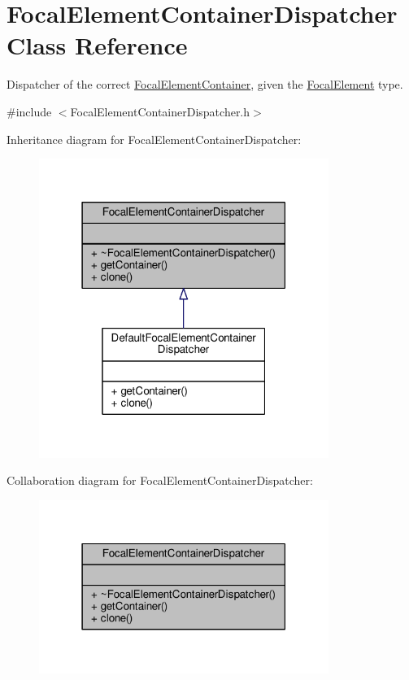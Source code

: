 \hypertarget{classFocalElementContainerDispatcher}{}\section{Focal\+Element\+Container\+Dispatcher Class Reference}
\label{classFocalElementContainerDispatcher}


Dispatcher of the correct \hyperlink{classFocalElementContainer}{Focal\+Element\+Container}, given the \hyperlink{classFocalElement}{Focal\+Element} type.  




{\ttfamily \#include $<$Focal\+Element\+Container\+Dispatcher.\+h$>$}



Inheritance diagram for Focal\+Element\+Container\+Dispatcher\+:\nopagebreak
\begin{figure}[H]
\begin{center}
\leavevmode
\includegraphics[width=267pt]{classFocalElementContainerDispatcher__inherit__graph}
\end{center}
\end{figure}


Collaboration diagram for Focal\+Element\+Container\+Dispatcher\+:\nopagebreak
\begin{figure}[H]
\begin{center}
\leavevmode
\includegraphics[width=267pt]{classFocalElementContainerDispatcher__coll__graph}
\end{center}
\end{figure}

